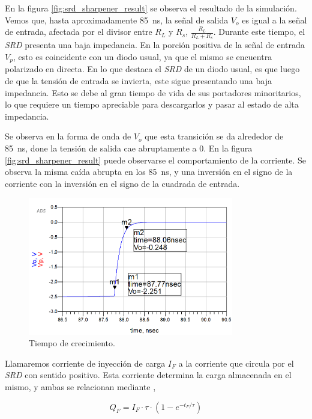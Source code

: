 En la figura \ref{fig:srd_sharpener_result} se observa el resultado de la
simulación. Vemos que, hasta aproximadamente \qty{85}{\nano\second}, la señal de
salida $V_o$ es igual a la señal de entrada, afectada por el divisor entre $R_L$
y $R_s$, $\frac{R_L}{R_L+R_s}$. Durante este tiempo, el \textit{SRD} presenta
una baja impedancia. En la porción positiva de la señal de entrada $V_p$, esto
es coincidente con un diodo usual, ya que el mismo se encuentra polarizado en
directa. En lo que destaca el \textit{SRD} de un diodo usual, es que luego de que la
tensión de entrada se invierta, este sigue presentando una baja impedancia. Esto
se debe al gran tiempo de vida de sus portadores minoritarios, lo que requiere
un tiempo apreciable para descargarlos y pasar al estado de alta impedancia.

Se observa en la forma de onda de $V_o$ que esta transición se da alrededor de
\qty{85}{\nano\second}, done la tensión de salida cae abruptamente a $0$. En la
figura \ref{fig:srd_sharpener_result} puede observarse el comportamiento
de la corriente. Se observa la misma caída abrupta en los
\qty{85}{\nano\second}, y una inversión en el signo de la corriente con la
inversión en el signo de la cuadrada de entrada.

\begin{figure}[tbp]
    \centering
    \includegraphics[width=0.8\textwidth]{images/srd_sharpener_result_rise_time.png}
    \caption{Tiempo de crecimiento.}
    \label{fig:srd_sharpener_result_rise_time}
\end{figure}

Llamaremos corriente de inyección de carga $I_F$ a la corriente que circula por
el \textit{SRD} con sentido positivo. Esta corriente determina la carga
almacenada en el mismo, y ambas se relacionan mediante \cite{an918},
\cite{moll1969}

\begin{equation}
    Q_F = I_F \cdot \tau \cdot \left( 1 - e^{-t_F/\tau}\right)
\end{equation}

